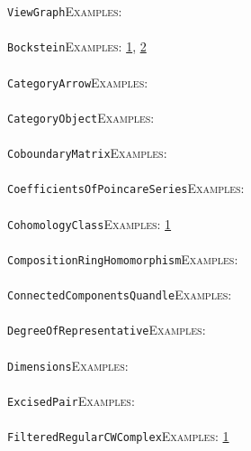 \documentclass[a4paper,11pt]{report}
\begin{document}
{{ \texttt{ViewGraph}{\nobreakspace}{\nobreakspace}{\nobreakspace}{\nobreakspace}\textsc{Examples:} \\
 \\
 \texttt{Bockstein}{\nobreakspace}{\nobreakspace}{\nobreakspace}{\nobreakspace}\textsc{Examples:} \href{tutorial/chap7.html} {1}{\nobreakspace}, \href{../www/SideLinks/About/aboutModPRings.html} {2}{\nobreakspace} \\
 \\
 \texttt{CategoryArrow}{\nobreakspace}{\nobreakspace}{\nobreakspace}{\nobreakspace}\textsc{Examples:} \\
 \\
 \texttt{CategoryObject}{\nobreakspace}{\nobreakspace}{\nobreakspace}{\nobreakspace}\textsc{Examples:} \\
 \\
 \texttt{CoboundaryMatrix}{\nobreakspace}{\nobreakspace}{\nobreakspace}{\nobreakspace}\textsc{Examples:} \\
 \\
 \texttt{CoefficientsOfPoincareSeries}{\nobreakspace}{\nobreakspace}{\nobreakspace}{\nobreakspace}\textsc{Examples:} \\
 \\
 \texttt{CohomologyClass}{\nobreakspace}{\nobreakspace}{\nobreakspace}{\nobreakspace}\textsc{Examples:} \href{../www/SideLinks/About/aboutGouter.html} {1}{\nobreakspace} \\
 \\
 \texttt{CompositionRingHomomorphism}{\nobreakspace}{\nobreakspace}{\nobreakspace}{\nobreakspace}\textsc{Examples:} \\
 \\
 \texttt{ConnectedComponentsQuandle}{\nobreakspace}{\nobreakspace}{\nobreakspace}{\nobreakspace}\textsc{Examples:} \\
 \\
 \texttt{DegreeOfRepresentative}{\nobreakspace}{\nobreakspace}{\nobreakspace}{\nobreakspace}\textsc{Examples:} \\
 \\
 \texttt{Dimensions}{\nobreakspace}{\nobreakspace}{\nobreakspace}{\nobreakspace}\textsc{Examples:} \\
 \\
 \texttt{ExcisedPair}{\nobreakspace}{\nobreakspace}{\nobreakspace}{\nobreakspace}\textsc{Examples:} \\
 \\
 \texttt{FilteredRegularCWComplex}{\nobreakspace}{\nobreakspace}{\nobreakspace}{\nobreakspace}\textsc{Examples:} \href{tutorial/chap4.html} {1}{\nobreakspace} \\
}}
\end{document}
